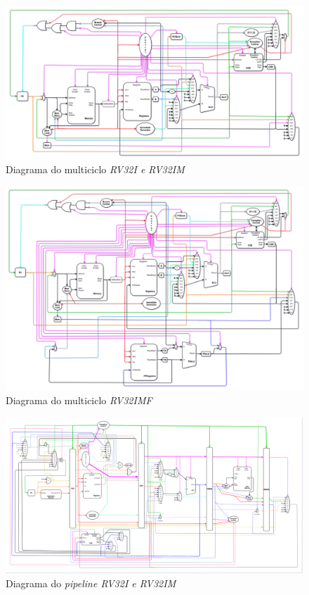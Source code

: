 \begin{figure}[H]
\centering
    \includegraphics[angle=90,width=1\textwidth,height=1\textheight,keepaspectratio]{../images/uarch_diagrams/multicycle-RV32I-RV32IM.png}
    \caption{Diagrama do multiciclo \textit{RV32I e RV32IM}}
\end{figure}

\begin{figure}[H]
\centering
    \includegraphics[angle=90,width=1\textwidth,height=1\textheight,keepaspectratio]{../images/uarch_diagrams/multicycle-RV32IMF.png}
    \caption{Diagrama do multiciclo \textit{RV32IMF}}
\end{figure}

\begin{figure}[H]
\centering
    \includegraphics[angle=90,width=1\textwidth,height=1\textheight,keepaspectratio]{../images/uarch_diagrams/pipeline-RV32I-RV32IM.png}
    \caption{Diagrama do \textit{pipeline RV32I e RV32IM}}
\end{figure}

